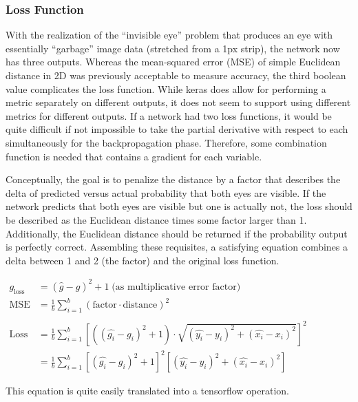 \documentclass[aip, rsi, amsmath, amssymb, reprint, author-year, longbibliography]{revtex4-1}
\begin{document}
\subsubsection{\label{sec:level3} Loss Function}

With the realization of the ``invisible eye'' problem that produces an eye with
essentially ``garbage'' image data (stretched from a 1px strip), the network now
has three outputs. Whereas the mean-squared error (MSE) of simple Euclidean
distance in 2D was previously acceptable to measure accuracy, the third boolean
value complicates the loss function. While keras does allow for performing a
metric separately on different outputs, it does not seem to support using
different metrics for different outputs. If a network had two loss functions, it
would be quite difficult if not impossible to take the partial derivative with
respect to each simultaneously for the backpropagation phase. Therefore, some
combination function is needed that contains a gradient for each variable.

Conceptually, the goal is to penalize the distance by a factor that describes
the delta of predicted versus actual probability that both eyes are visible. If
the network predicts that both eyes are visible but one is actually not, the
loss should be described as the Euclidean distance times some factor larger than
1. Additionally, the Euclidean distance should be returned if the probability
output is perfectly correct. Assembling these requisites, a satisfying equation
combines a delta between 1 and 2 (the factor) and the original loss function.
\vspace{3mm}

{\small
\begin{math}
\begin{aligned}
    g_{\text{loss}} &= (\hat{g} - g)^2 + 1\; \text{(as multiplicative error factor)}\\
    \text{MSE} &= \frac{1}{b}\sum_{i=1}^b(\text{factor}\cdot\text{distance})^2\\\\
    \text{Loss} &= \frac{1}{b}\sum_{i=1}^b\left[\left((\hat{g_i} - g_i)^2 + 1\right)\cdot\sqrt{(\hat{y_i} - y_i)^2 + (\hat{x_i} - x_i)^2}\right]^2\\
    &= \frac{1}{b}\sum_{i=1}^b\left[(\hat{g_i} - g_i)^2 + 1\right]^2\left[(\hat{y_i} - y_i)^2 + (\hat{x_i} - x_i)^2\right]
\end{aligned}
\end{math}
}

\setlength\parindent{0pt}
This equation is quite easily translated into a tensorflow operation.
\setlength\parindent{10pt}
\end{document}
